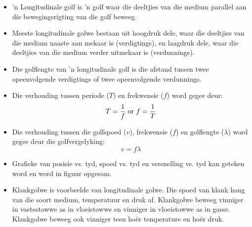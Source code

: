     \noindent
  \label{m38782**end}
                   \label{m38783*cid8}


\nopagebreak
      \label{m38783*id293550}\begin{itemize}[noitemsep] 
            \label{m38783*uid20}\item 'n Longitudinale golf is 'n golf waar die deeltjies van die medium parallel aan die bewegingsrigting van die golf beweeg.
\label{m38783*uid21}\item Meeste longitudinale golwe bestaan uit hoogdruk dele, waar die deeltjies van die medium naaste aan mekaar is (verdigtings), en laagdruk dele, waar die deeltjies van die medium verder uitmekaar is (verdunnings).
\label{m38783*uid22}\item Die golflengte van 'n longitudinale golf is die afstand tussen twee opeenvolgende verdigtings of twee opeenvolgende verdunnings.
\label{m38783*uid23}\item Die verhouding tussen periode ($T$) en frekwensie ($f$) word gegee deur:
\label{m38783*id293619}\nopagebreak\noindent{}
    \begin{equation*}\nonumber
    T=\frac{1}{f}\phantom{\rule{3pt}{0ex}}\text{or}\phantom{\rule{3pt}{0ex}}f=\frac{1}{T}
      \end{equation*}
    \label{m38783*uid24}\item Die verhouding tussen die golfspoed ($v$), frekwensie ($f$) en golflengte ($\lambda$) word gegee deur die golfvergelyking:
\label{m38783*id293694}\nopagebreak\noindent{}
    \begin{equation*}\nonumber
    v=f\lambda
      \end{equation*}
    \label{m38783*uid25}\item Grafieke van posisie vs. tyd, spoed vs. tyd en versnelling vs. tyd kan geteken word en word in figuur \label{m38783*uid26} opgesom.
\item Klankgolwe is voorbeelde van longitudinale golwe. Die spoed van klank hang van die soort medium, temperatuur en druk af. Klankgolwe beweeg vinniger in vastestowwe as in vloeistowwe en vinniger in vloeistowwe as in gasse. Klankgolwe beweeg ook vinniger teen ho\"er temperature en ho\"er druk.
\end{itemize}
